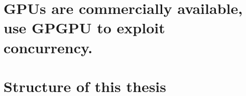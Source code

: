 \section{GPUs are commercially available, use GPGPU to exploit concurrency.}
%
\section{Structure of this thesis}
